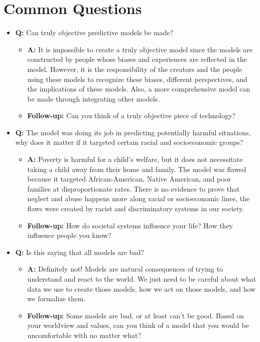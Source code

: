 \documentclass{article}
\begin{document}
\section{Common Questions}
    \begin{itemize}
        \item \textbf{Q:} Can truly objective predictive models be made?
        \begin{itemize}
            \item \textbf{A:} It is impossible to create a truly objective model since the models are constructed by people whose biases and experiences are reflected in the model. However, it is the responsibility of the creators and the people using these models to recognize these biases, different perspectives, and the implications of these models. Also, a more comprehensive model can be made through integrating other models.
            \item \textbf{Follow-up:} Can you think of a truly objective piece of technology?
        \end{itemize}
        \item \textbf{Q:} The model was doing its job in predicting potentially harmful situations, why does it matter if it targeted certain racial and socioeconomic groups?
        \begin{itemize}
            \item \textbf{A:} Poverty is harmful for a child’s welfare, but it does not necessitate taking a child away from their home and family. The model was flawed because it targeted African-American, Native American, and poor families at disproportionate rates. There is no evidence to prove that neglect and abuse happens more along racial or socioeconomic lines, the flaws were created by racist and discriminatory systems in our society.
            \item \textbf{Follow-up:} How do societal systems influence your life? How they influence people you know?
        \end{itemize}
        \item \textbf{Q:} Is this saying that all models are bad?
        \begin{itemize}
            \item \textbf{A:} Definitely not! Models are natural consequences of trying to understand and react to the world. We just need to be careful about what data we use to create those models, how we act on those models, and how we formalize them.
            \item \textbf{Follow-up:} Some models are bad, or at least can’t be good. Based on your worldview and values, can you think of a model that you would be uncomfortable with no matter what?
        \end{itemize}
    \end{itemize}
\end{document}
